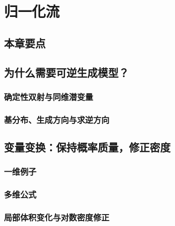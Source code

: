\chapter{归一化流}
\label{chap:flow}

\section*{本章要点}
\contentplaceholder

\section{为什么需要可逆生成模型？}
\label{sec:flow-motivation}
\contentplaceholder

\subsection{确定性双射与同维潜变量}
\label{subsec:flow-bijection}
\contentplaceholder

\subsection{基分布、生成方向与求逆方向}
\label{subsec:flow-directions}
\contentplaceholder

\section{变量变换：保持概率质量，修正密度}
\label{sec:flow-change-of-variables}
\contentplaceholder

\subsection{一维例子}
\label{subsec:flow-one-dimensional}
\contentplaceholder

\subsection{多维公式}
\label{subsec:flow-multidimensional}
\contentplaceholder

\subsection{局部体积变化与对数密度修正}
\label{subsec:flow-volume}
\contentplaceholder


